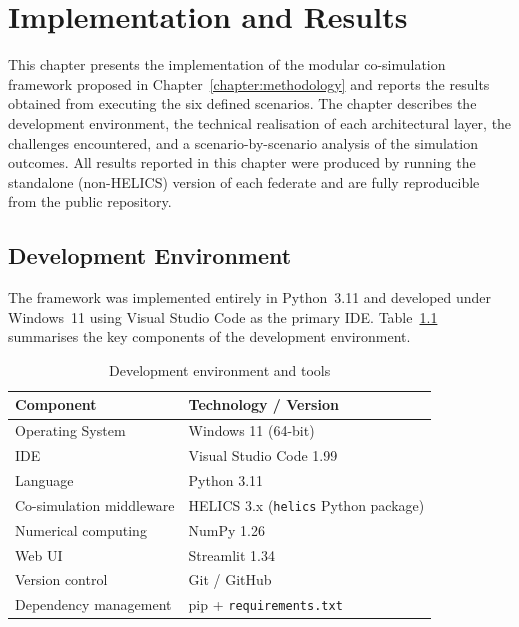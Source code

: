 \chapter{Implementation and Results}%
\label{chapter:implementation}

\begin{introduction}
This chapter presents the implementation of the modular co-simulation framework proposed in Chapter~\ref{chapter:methodology} and reports the results obtained from executing the six defined scenarios. The chapter describes the development environment, the technical realisation of each architectural layer, the challenges encountered, and a scenario-by-scenario analysis of the simulation outcomes. All results reported in this chapter were produced by running the standalone (non-HELICS) version of each federate and are fully reproducible from the public repository.
\end{introduction}


\section{Development Environment}

The framework was implemented entirely in Python~3.11 and developed under Windows~11 using Visual Studio Code as the primary IDE. Table~\ref{tab:devenv} summarises the key components of the development environment.

\begin{table}[h]
    \centering
    \caption{Development environment and tools}
    \label{tab:devenv}
    \begin{tabular}{ll}
        \toprule
        \textbf{Component} & \textbf{Technology / Version} \\
        \midrule
        Operating System   & Windows 11 (64-bit) \\
        IDE                & Visual Studio Code 1.99 \\
        Language           & Python 3.11 \\
        Co-simulation middleware & HELICS 3.x (\texttt{helics} Python package) \\
        Numerical computing & NumPy 1.26 \\
        Web UI             & Streamlit 1.34 \\
        Version control    & Git / GitHub \\
        Dependency management & pip + \texttt{requirements.txt} \\
        \bottomrule
    \end{tabular}
\end{table}

